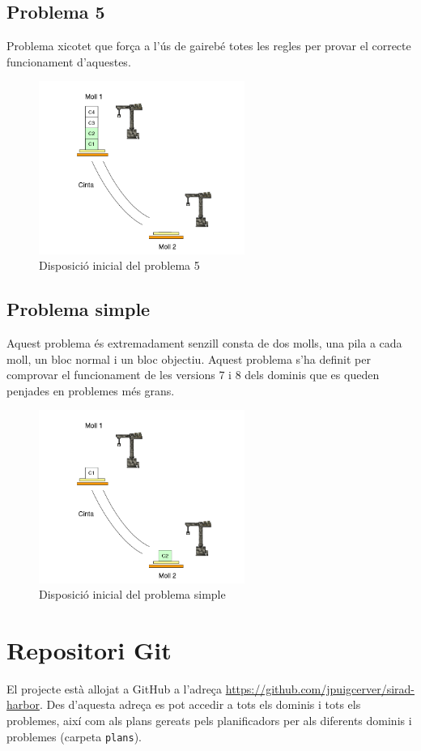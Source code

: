 \documentclass[10pt,a4paper]{article}
\begin{document}
\subsection*{Problema 5}
Problema xicotet que força a l'ús de gairebé totes les regles per provar el correcte funcionament d'aquestes.

\begin{figure}[h]
\centering
\includegraphics[width=0.6\textwidth]{prob5}
\caption{Disposició inicial del problema 5}
\label{fig:p5}
\end{figure}

\subsection*{Problema simple}
Aquest problema és extremadament senzill consta de dos molls, una pila a cada moll, un bloc normal i un bloc objectiu. Aquest
problema s'ha definit per comprovar el funcionament de les versions 7 i 8 dels dominis que es queden penjades en problemes
més grans.

\begin{figure}[h]
\centering
\includegraphics[width=0.6\textwidth]{probS}
\caption{Disposició inicial del problema simple}
\label{fig:pS}
\end{figure}

\section*{Repositori Git}
El projecte està allojat a GitHub a l'adreça \url{https://github.com/jpuigcerver/sirad-harbor}.
Des d'aquesta adreça es pot accedir a tots els dominis i tots els problemes, així com als plans
gereats pels planificadors per als diferents dominis i problemes (carpeta \texttt{plans}).
\end{document}
